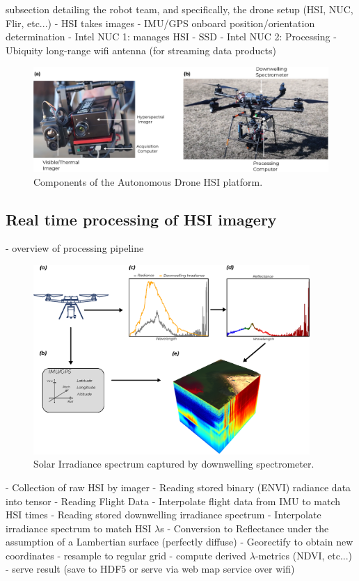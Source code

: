 \documentclass[remotesensing,article,submit,pdftex,moreauthors]{Definitions/mdpi}
\begin{document}
subsection detailing the robot team, and specifically, the drone setup (HSI, NUC, Flir, etc...) 
- HSI takes images 
- IMU/GPS onboard position/orientation determination
- Intel NUC 1: manages HSI
- SSD
- Intel NUC 2: Processing 
- Ubiquity long-range wifi antenna (for streaming data products)

\begin{figure}[H]
    \centering
    \includegraphics[width=12cm]{./assets/annotated-drone.eps}
    \caption{Components of the Autonomous Drone HSI platform.}
    \label{fig:drone-components}
\end{figure}


\subsection{Real time processing of HSI imagery}

- overview of processing pipeline

\begin{figure}[H]
    \centering
    \includegraphics[width=10.5cm]{./figures/pipeline-figure.eps}
    \caption{Solar Irradiance spectrum captured by downwelling spectrometer.}
    \label{fig:annotated-hsi}
\end{figure}

- Collection of raw HSI by imager
- Reading stored binary (ENVI) radiance data into tensor
- Reading Flight Data 
- Interpolate flight data from IMU to match HSI times
- Reading stored downwelling irradiance spectrum 
- Interpolate irradiance spectrum to match HSI $\lambda$s 
- Conversion to Reflectance under the assumption of a Lambertian surface (perfectly diffuse)
- Georectify to obtain new coordinates
- resample to regular grid
- compute derived $\lambda$-metrics (NDVI, etc...) 
- serve result (save to HDF5 or serve via web map service over wifi) 
\end{document}
